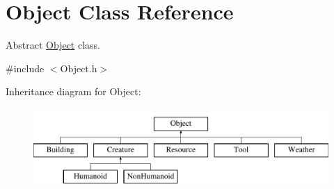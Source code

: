 \hypertarget{classObject}{\section{Object Class Reference}
\label{classObject}
}


Abstract \hyperlink{classObject}{Object} class.  




{\ttfamily \#include $<$Object.\-h$>$}

Inheritance diagram for Object\-:\begin{figure}[H]
\begin{center}
\leavevmode
\includegraphics[height=3.000000cm]{classObject}
\end{center}
\end{figure}
